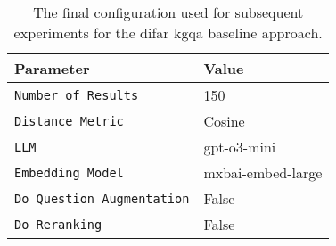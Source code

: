 \begin{table}[t]
    \centering
    \begin{tabular}{l l}   
        \toprule
        \textbf{Parameter} & \textbf{Value} \\
        \midrule
        \texttt{Number of Results} & 150 \\
        \texttt{Distance Metric} & Cosine \\
        \texttt{LLM} & gpt-o3-mini \\
        \texttt{Embedding Model} & mxbai-embed-large \\ 
        \texttt{Do Question Augmentation} & False \\
        \texttt{Do Reranking} & False \\
        \bottomrule
    \end{tabular}
    \caption[Final Configuration for DiFaR]{The final configuration used for subsequent experiments for the \gls{difar} \gls{kgqa} baseline approach.}
    \label{tab:difar_final_config}
\end{table}
